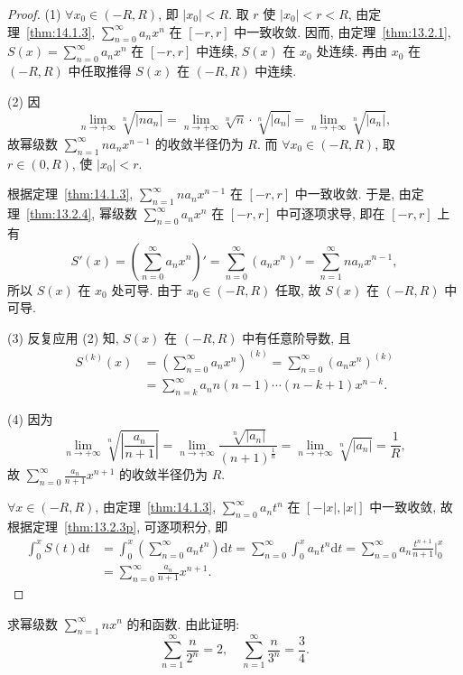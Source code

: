 \begin{proof}
(1) $\forall x_{0}\in(-R,R)$, 即 $|x_{0}|<R$. 取 $r$ 使 $|x_{0}|<r<R$, 由定理~\ref{thm:14.1.3}, $\sum_{n=0}^{\infty}a_{n}x^{n}$ 在 $[-r,r]$ 中一致收敛. 因而, 由定理~\ref{thm:13.2.1}, $S(x)=\sum_{n=0}^{\infty}a_{n}x^{n}$ 在 $[-r,r]$ 中连续, $S(x)$ 在 $x_{0}$ 处连续. 再由 $x_{0}$ 在 $(-R,R)$ 中任取推得 $S(x)$ 在 $(-R,R)$ 中连续.

(2) 因
\[
  \lim_{n\to+\infty}\sqrt[n]{|na_{n}|}=\lim_{n\to+\infty}\sqrt[n]{n}\cdot\sqrt[n]{|a_{n}|}=\lim_{n\to+\infty}\sqrt[n]{|a_{n}|},
\]
故幂级数 $\sum_{n=1}^{\infty}na_{n}x^{n-1}$ 的收敛半径仍为 $R$. 而 $\forall x_{0}\in(-R,R)$, 取 $r\in(0,R)$, 使 $|x_{0}|<r$.

根据定理~\ref{thm:14.1.3}, $\sum_{n=1}^{\infty}na_{n}x^{n-1}$ 在 $[-r,r]$ 中一致收敛. 于是, 由定理~\ref{thm:13.2.4}, 幂级数 $\sum_{n=0}^{\infty}a_{n}x^{n}$ 在 $[-r,r]$ 中可逐项求导, 即在 $[-r,r]$ 上有
\[
  S'(x)=\left(\sum_{n=0}^{\infty}a_{n}x^{n}\right)'=\sum_{n=0}^{\infty}(a_{n}x^{n})'=\sum_{n=1}^{\infty}na_{n}x^{n-1},
\]
所以 $S(x)$ 在 $x_{0}$ 处可导. 由于 $x_{0}\in(-R,R)$ 任取, 故 $S(x)$ 在 $(-R,R)$ 中可导.

(3) 反复应用 (2) 知, $S(x)$ 在 $(-R,R)$ 中有任意阶导数, 且
\[
  \begin{aligned}
    S^{(k)}(x)&=\left(\sum_{n=0}^{\infty}a_{n}x^{n}\right)^{(k)}=\sum_{n=0}^{\infty}(a_{n}x^{n})^{(k)}\\
    &=\sum_{n=k}^{\infty}a_{n}n(n-1)\cdots(n-k+1)x^{n-k}.
  \end{aligned}
\]

(4) 因为
\[
  \lim_{n\to+\infty}\sqrt[n]{\left|\frac{a_{n}}{n+1}\right|}=\lim_{n\to+\infty}\frac{\sqrt[n]{|a_{n}|}}{(n+1)^{\frac{1}{n}}}=\lim_{n\to+\infty}\sqrt[n]{|a_{n}|}=\frac{1}{R},
\]
故 $\sum_{n=0}^{\infty}\frac{a_{n}}{n+1}x^{n+1}$ 的收敛半径仍为 $R$.

$\forall x\in(-R,R)$, 由定理~\ref{thm:14.1.3}, $\sum_{n=0}^{\infty}a_{n}t^{n}$ 在 $[-|x|,|x|]$ 中一致收敛, 故根据定理~\ref{thm:13.2.3p}, 可逐项积分, 即
\[
  \begin{aligned}
    \int_{0}^{x}S(t)\mathrm{d}t&=\int_{0}^{x}\left(\sum_{n=0}^{\infty}a_{n}t^{n}\right)\mathrm{d}t=\sum_{n=0}^{\infty}\int_{0}^{x}a_{n}t^{n}\mathrm{d}t=\sum_{n=0}^{\infty}a_{n}\frac{t^{n+1}}{n+1}\bigg|_{0}^{x}\\
    &=\sum_{n=0}^{\infty}\frac{a_{n}}{n+1}x^{n+1}.
  \end{aligned}
\]
\end{proof}

\begin{example}\label{ex:14.1.5}
求幂级数 $\sum_{n=1}^{\infty}nx^{n}$ 的和函数. 由此证明:
\[
  \sum_{n=1}^{\infty}\frac{n}{2^{n}}=2,\quad\sum_{n=1}^{\infty}\frac{n}{3^{n}}=\frac{3}{4}.
\]
\end{example}

